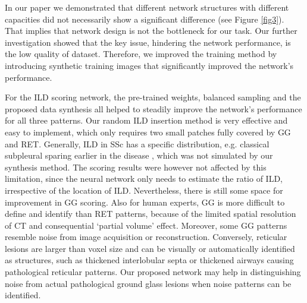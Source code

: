 In our paper we demonstrated that different network structures with different capacities did not necessarily show a significant difference (see Figure \ref{fig3}). That implies that network design is not the bottleneck for our task. Our further investigation showed that the key issue, hindering the network performance, is the low quality of dataset. Therefore, we improved the training method by introducing synthetic training images that significantly improved the network’s performance.

For the ILD scoring network, the pre-trained weights, balanced sampling and the proposed data synthesis all helped to steadily improve the network’s performance for all three patterns. Our random ILD insertion method is very effective and easy to implement, which only requires two small patches fully covered by GG and RET. Generally, ILD in SSc has a specific distribution, e.g. classical subpleural sparing earlier in the disease \cite{Herzog2014}, which was not simulated by our synthesis method. The scoring results were however not affected by this limitation, since the neural network only needs to estimate the ratio of ILD, irrespective of the location of ILD. Nevertheless, there is still some space for improvement in GG scoring. Also for human experts, GG is more difficult to define and identify than RET patterns, because of the limited spatial resolution of CT and consequential ‘partial volume’ effect. Moreover, some GG patterns resemble noise from image acquisition or reconstruction. Conversely, reticular lesions are larger than voxel size and can be visually or automatically identified as structures, such as thickened interlobular septa or thickened airways causing pathological reticular patterns. Our proposed network may help in distinguishing noise from actual pathological ground glass lesions when noise patterns can be identified. 

